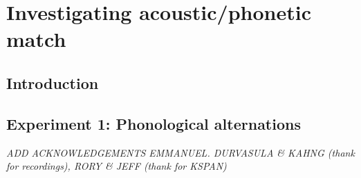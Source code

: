 {%






\newpage
\section{{\color{red}Investigating acoustic/phonetic match}} \label{3-acmatch}


\subsection{Introduction}
\subsection{{\color{red}Experiment 1: Phonological alternations}}
\small{\textit{{\color{red}ADD ACKNOWLEDGEMENTS EMMANUEL. DURVASULA \& KAHNG (thank for recordings), RORY \& JEFF (thank for KSPAN)}}}

}
